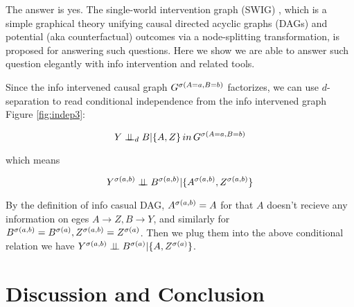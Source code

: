 The answer is yes. The single-world intervention graph (SWIG)  \cite{Richardson2011, richardson2013single}, which is a simple graphical theory unifying causal directed acyclic graphs (DAGs) and potential (aka counterfactual) outcomes via a node-splitting transformation, is proposed for answering such questions. Here we show we are able to answer such question elegantly with info intervention and related tools.

Since the info intervened causal graph $G^{\mathrm{\sigma}(A=a, B=b)}$ factorizes, we can use $d$-separation to read conditional independence from the info intervened graph Figure \ref{fig:indep3}:

$$
Y \perp\mkern-9.5mu\perp_d B | \{A, Z\} \, in \, G^{\mathrm{\sigma}(A=a, B=b)}
$$

which means

$$
Y^{\mathrm{\sigma}(a, b)} \perp\mkern-9.5mu\perp B^{\mathrm{\sigma}(a, b)} | \{A^{\mathrm{\sigma}(a, b)}, Z^{\mathrm{\sigma}(a, b)}\} 
$$

By the definition of info casual DAG, $A^{\mathrm{\sigma}(a, b)}= A$ for that $A$ doesn't recieve any information on eges $A \rightarrow Z, B \rightarrow Y$, and similarly for $B^{\mathrm{\sigma}(a, b)} = B^{\mathrm{\sigma}(a)}, Z^{\mathrm{\sigma}(a, b)} = Z^{\mathrm{\sigma}(a)}$. Then we plug them into the above conditional relation we have $Y^{\mathrm{\sigma}(a, b)} \perp\mkern-9.5mu\perp B^{\mathrm{\sigma}(a)} | \{A, Z^{\mathrm{\sigma}(a)}\}$.






\section{Discussion and Conclusion}

%
%
%

